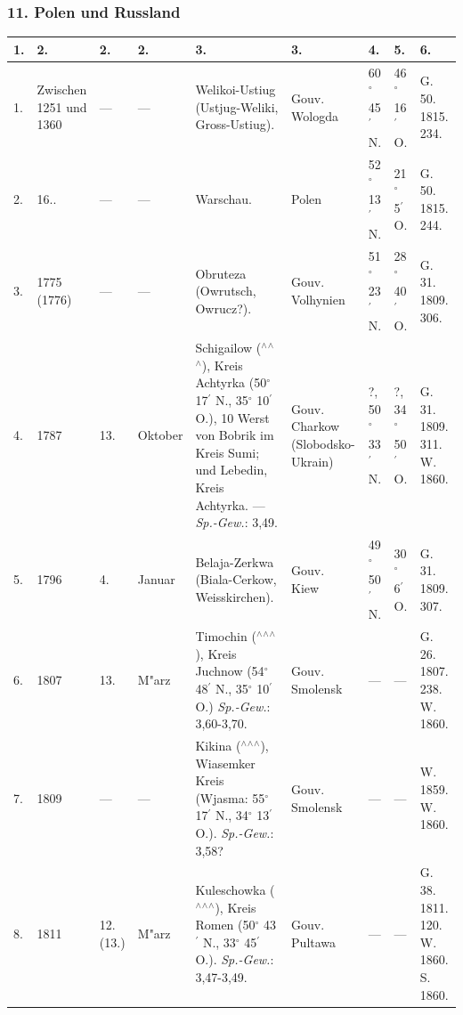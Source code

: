 \documentclass[a4paper, 8pt, oneside, polutonikogreek, german]{article}
\begin{document}
\subsubsection{11. Polen und Russland}
\begin{center}
    \footnotesize
    \begin{longtable}{|p{3mm}|p{13mm}|p{5mm}|p{16mm}|p{25mm}|p{16mm}|p{13mm}|p{13mm}|p{13mm}|}
    \hline
        1. & 2. & 2. & 2. & 3. & 3. & 4. & 5. & 6. \\ \hline
        1. & Zwischen 1251 und 1360 & --- & --- & Welikoi-Ustiug (Ustjug-Weliki, Gross-Ustiug). & Gouv. Wologda & 60$^\circ$ 45$^\prime$ N. & 46$^\circ$ 16$^\prime$ O. & G. 50. 1815. 234. \\ \hline
        2. & 16.. & --- & --- & Warschau. & Polen & 52$^\circ$ 13$^\prime$ N. & 21$^\circ$ 5$^\prime$ O. & G. 50. 1815. 244. \\ \hline
        3. & 1775 (1776) & --- & --- & Obruteza (Owrutsch, Owrucz?). & Gouv. Volhynien & 51$^\circ$ 23$^\prime$ N. & 28$^\circ$ 40$^\prime$ O. & G. 31. 1809. 306. \\ \hline
        4. & 1787 & 13. & Oktober & Schigailow ($^\wedge$$^\wedge$$^\wedge$), Kreis Achtyrka (50$^\circ$ 17$^\prime$ N., 35$^\circ$ 10$^\prime$ O.), 10 Werst von Bobrik im Kreis Sumi; und Lebedin, Kreis Achtyrka. --- \emph{Sp.-Gew.}: 3,49. & Gouv. Charkow (Slobodsko-Ukrain) & ?, 50$^\circ$ 33$^\prime$ N. & ?, 34$^\circ$ 50$^\prime$ O. & G. 31. 1809. 311. W. 1860. \\ \hline
        5. & 1796 & 4. & Januar & Belaja-Zerkwa (Biala-Cerkow, Weisskirchen). & Gouv. Kiew & 49$^\circ$ 50$^\prime$ N. & 30$^\circ$ 6$^\prime$ O. & G. 31. 1809. 307. \\ \hline
        6. & 1807 & 13. & M"arz & Timochin ($^\wedge$$^\wedge$$^\wedge$), Kreis Juchnow (54$^\circ$ 48$^\prime$ N., 35$^\circ$ 10$^\prime$ O.) \emph{Sp.-Gew.}: 3,60-3,70. & Gouv. Smolensk & --- & --- & G. 26. 1807. 238. W. 1860. \\ \hline
        7. & 1809 & --- & --- & Kikina ($^\wedge$$^\wedge$$^\wedge$), Wiasemker Kreis (Wjasma: 55$^\circ$ 17$^\prime$ N., 34$^\circ$ 13$^\prime$ O.). \emph{Sp.-Gew.}: 3,58? & Gouv. Smolensk & --- & --- & W. 1859. W. 1860. \\ \hline
        8. & 1811 & 12. (13.) & M"arz & Kuleschowka ($^\wedge$$^\wedge$$^\wedge$), Kreis Romen (50$^\circ$ 43$^\prime$ N., 33$^\circ$ 45$^\prime$ O.). \emph{Sp.-Gew.}: 3,47-3,49. & Gouv. Pultawa & --- & --- & G. 38. 1811. 120. W. 1860. S. 1860. \\ \hline

\end{longtable}
\end{center}
\end{document}
